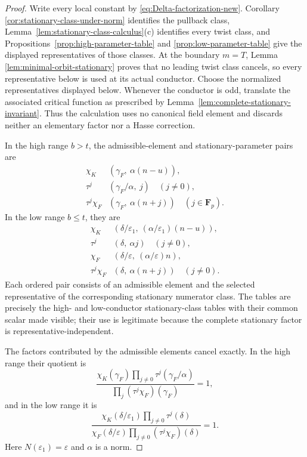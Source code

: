 \documentclass[11pt]{amsart}
\theoremstyle{definition}
\theoremstyle{remark}
\newcommand{\F}{\mathbf F}
\newcommand{\eps}{\varepsilon}
\begin{document}
\begin{proof}
Write every local constant by
\eqref{eq:Delta-factorization-new}.  Corollary
\ref{cor:stationary-class-under-norm} identifies the pullback class,
Lemma~\ref{lem:stationary-class-calculus}(c) identifies every twist
class, and Propositions~\ref{prop:high-parameter-table} and
\ref{prop:low-parameter-table} give the displayed representatives of
those classes.  At the boundary $m=T$, Lemma
\ref{lem:minimal-orbit-stationary} proves that no leading twist class
cancels, so every representative below is used at its actual conductor.
Choose the normalized representatives displayed below.  Whenever the
conductor is odd, translate the associated critical function as
prescribed by Lemma~\ref{lem:complete-stationary-invariant}.  Thus the
calculation uses no canonical field element and discards neither an
elementary factor nor a Hasse correction.

In the high range $b>t$, the admissible-element and stationary-parameter
pairs are
\[
 \begin{array}{c|c}
 \chi_K&(\gamma_F,\ \alpha(n-u)),\\
 \tau^j&(\gamma_F/\alpha,\ j)\quad(j\ne0),\\
 \tau^j\chi_F&(\gamma_F,\ \alpha(n+j))\quad(j\in\F_p).
 \end{array}
\]
In the low range $b\le t$, they are
\[
 \begin{array}{c|c}
 \chi_K&(\delta/\eps_1,\ (\alpha/\eps_1)(n-u)),\\
 \tau^j&(\delta,\ \alpha j)\quad(j\ne0),\\
 \chi_F&(\delta/\eps,\ (\alpha/\eps)n),\\
 \tau^j\chi_F&(\delta,\ \alpha(n+j))\quad(j\ne0).
 \end{array}
\]
Each ordered pair consists of an admissible element and the selected
representative of the corresponding stationary numerator class.  The
tables are precisely the high- and low-conductor stationary-class tables
with their common scalar made visible; their use is legitimate because
the complete stationary factor is representative-independent.

The factors contributed by the admissible elements cancel exactly.  In
the high range their quotient is
\[
 \frac{\chi_K(\gamma_F)
       \prod_{j\ne0}\tau^j(\gamma_F/\alpha)}
      {\prod_j(\tau^j\chi_F)(\gamma_F)}=1,
\]
and in the low range it is
\[
 \frac{\chi_K(\delta/\eps_1)\prod_{j\ne0}\tau^j(\delta)}
      {\chi_F(\delta/\eps)
       \prod_{j\ne0}(\tau^j\chi_F)(\delta)}=1.
\]
Here $N(\eps_1)=\eps$ and $\alpha$ is a norm.


\end{proof}
\end{document}
